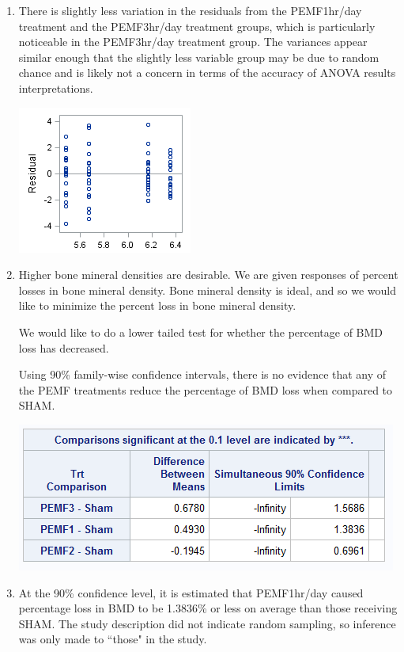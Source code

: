 \documentclass{article}\usepackage[]{graphicx}\usepackage[]{color}
\begin{document}
\begin{enumerate}
\begin{enumerate}
\item %

There is slightly less variation in the residuals from the PEMF1hr/day treatment and the PEMF3hr/day treatment groups, which is particularly noticeable in the PEMF3hr/day treatment group. The variances appear similar enough that the slightly less variable group may be due to random chance and is likely not a concern in terms of the accuracy of ANOVA results interpretations.

\includegraphics{residpred4d}

\item %

Higher bone mineral densities are desirable. We are given responses of percent losses in bone mineral density. Bone mineral density is ideal, and so we would like to minimize the percent loss in bone mineral density.

We would like to do a lower tailed test for whether the percentage of BMD loss has decreased.

Using 90\% family-wise confidence intervals, there is no evidence that any of the PEMF treatments reduce the percentage of BMD loss when compared to SHAM.

\includegraphics{prob4e}

\item %

At the 90\% confidence level, it is estimated that PEMF1hr/day caused percentage loss in BMD to be 1.3836\% or less on average than those receiving SHAM. The study description did not indicate random sampling, so inference was only made to ``those" in the study.
\end{enumerate}


\end{enumerate}
\end{document}
